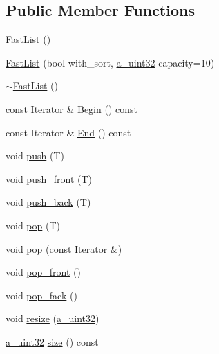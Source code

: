 \subsection*{Public Member Functions}
\begin{DoxyCompactItemize}
\item 
\hyperlink{class_agmd_utilities_1_1_queue_a7c5dd868d605b2bb825bc1f65d085088}{Fast\+List} ()
\item 
\hyperlink{class_agmd_utilities_1_1_queue_a2838825d95d7c13dfd76a6723d3eec00}{Fast\+List} (bool with\+\_\+sort, \hyperlink{_common_defines_8h_a964296f9770051b9e4807b1f180dd416}{a\+\_\+uint32} capacity=10)
\item 
\hyperlink{class_agmd_utilities_1_1_queue_a6eba6d43294da88438ad237097da8710}{$\sim$\+Fast\+List} ()
\item 
const Iterator \& \hyperlink{class_agmd_utilities_1_1_queue_a613d3ddc63e252090ed909a8d7162bfc}{Begin} () const 
\item 
const Iterator \& \hyperlink{class_agmd_utilities_1_1_queue_a58af1d46e39bd9f0638c818a70f4a141}{End} () const 
\item 
void \hyperlink{class_agmd_utilities_1_1_queue_a855a4462bf78f731c50429d81ad9a8ae}{push} (T)
\item 
void \hyperlink{class_agmd_utilities_1_1_queue_a256a820b7abde507c03d9f5961215ad1}{push\+\_\+front} (T)
\item 
void \hyperlink{class_agmd_utilities_1_1_queue_a36951c02584f4ec5611143b29e191608}{push\+\_\+back} (T)
\item 
void \hyperlink{class_agmd_utilities_1_1_queue_a4ce60ae9bb64f7307a61f3e0a84c4bfa}{pop} (T)
\item 
void \hyperlink{class_agmd_utilities_1_1_queue_ab115974f2588c8aed2bba9a6ce906cb8}{pop} (const Iterator \&)
\item 
void \hyperlink{class_agmd_utilities_1_1_queue_a5bcccbde6bc50dc7b55122f77f0226f8}{pop\+\_\+front} ()
\item 
void \hyperlink{class_agmd_utilities_1_1_queue_a68cab4b791556b5ad9fe21de68e43fff}{pop\+\_\+fack} ()
\item 
void \hyperlink{class_agmd_utilities_1_1_queue_ab8fafaf1f7f8f510034f32948464aeeb}{resize} (\hyperlink{_common_defines_8h_a964296f9770051b9e4807b1f180dd416}{a\+\_\+uint32})
\item 
\hyperlink{_common_defines_8h_a964296f9770051b9e4807b1f180dd416}{a\+\_\+uint32} \hyperlink{class_agmd_utilities_1_1_queue_a0321ce0ac34ec668431fdf4036ec8765}{size} () const 
\end{DoxyCompactItemize}


